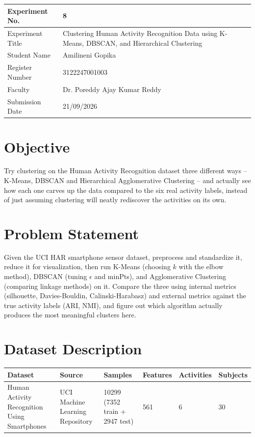 \documentclass[12pt,a4paper]{article}
\begin{document}
\begin{tabular}{|p{4cm}|p{11cm}|}
\hline
Experiment No. & 8 \\ \hline
Experiment Title & Clustering Human Activity Recognition Data using K-Means, DBSCAN, and Hierarchical
Clustering\footnotemark \\ \hline
Student Name & Amilineni Gopika \\ \hline
Register Number & 3122247001003 \\ \hline
Faculty & Dr. Poreddy Ajay Kumar Reddy \\ \hline
Submission Date & 21/09/2026 \\ \hline
\end{tabular}

\section{Objective}
Try clustering on the Human Activity Recognition dataset three different ways -- K-Means, DBSCAN and
Hierarchical Agglomerative Clustering -- and actually see how each one carves up the data compared to
the six real activity labels, instead of just assuming clustering will neatly rediscover the activities
on its own.

\section{Problem Statement}
Given the UCI HAR smartphone sensor dataset, preprocess and standardize it, reduce it for
visualization, then run K-Means (choosing $k$ with the elbow method), DBSCAN (tuning $\epsilon$ and
minPts), and Agglomerative Clustering (comparing linkage methods) on it. Compare the three using
internal metrics (silhouette, Davies-Bouldin, Calinski-Harabasz) and external metrics against the true
activity labels (ARI, NMI), and figure out which algorithm actually produces the most meaningful
clusters here.

\section{Dataset Description}
\begin{longtable}{|p{3.5cm}|p{4cm}|p{1.6cm}|p{1.8cm}|p{2cm}|p{2.2cm}|}
\hline
\textbf{Dataset} & \textbf{Source} & \textbf{Samples} & \textbf{Features} & \textbf{Activities} & \textbf{Subjects} \\ \hline
Human Activity Recognition Using Smartphones & UCI Machine Learning Repository & 10299 (7352 train +
2947 test) & 561 & 6 & 30 \\ \hline
\end{longtable}
\end{document}
